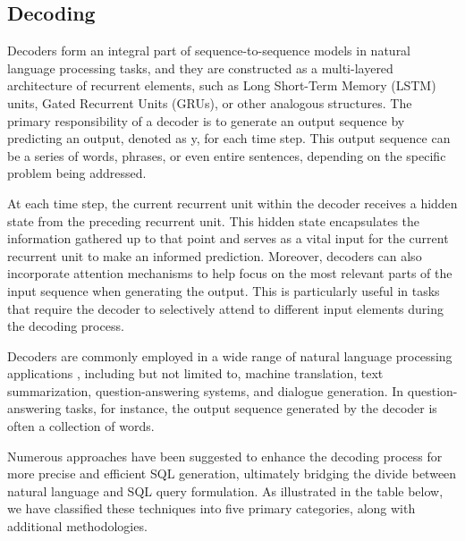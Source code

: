 \subsection{Decoding}

Decoders \cite{cho-etal-2014-learning} form an integral part of sequence-to-sequence models in natural language processing tasks, and they are constructed as a multi-layered architecture of recurrent elements, such as Long Short-Term Memory (LSTM) units, Gated Recurrent Units (GRUs), or other analogous structures. The primary responsibility of a decoder is to generate an output sequence by predicting an output, denoted as y, for each time step. This output sequence can be a series of words, phrases, or even entire sentences, depending on the specific problem being addressed.

At each time step, the current recurrent unit within the decoder receives a hidden state from the preceding recurrent unit. This hidden state encapsulates the information gathered up to that point and serves as a vital input for the current recurrent unit to make an informed prediction. Moreover, decoders can also incorporate attention mechanisms to help focus on the most relevant parts of the input sequence when generating the output. This is particularly useful in tasks that require the decoder to selectively attend to different input elements during the decoding process.

Decoders are commonly employed in a wide range of natural language processing applications \cite{kumar2022deep}, including but not limited to, machine translation, text summarization, question-answering systems, and dialogue generation. In question-answering tasks, for instance, the output sequence generated by the decoder is often a collection of words.

Numerous approaches have been suggested to enhance the decoding process for more precise and efficient SQL generation, ultimately bridging the divide between natural language and SQL query formulation. As illustrated in the table below, we have classified these techniques into five primary categories, along with additional methodologies\cite{deng2022recent}.

